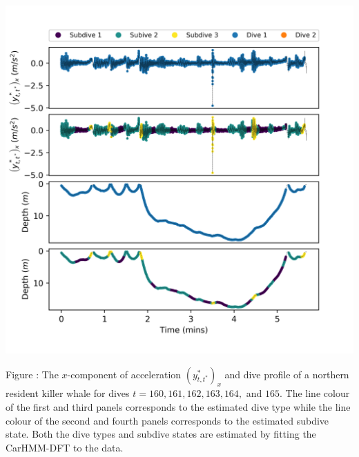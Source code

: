 \documentclass{article}
\begin{document}
        \begin{center}
        \includegraphics[width=6in]{../Plots/CarHMM_decoded_dives.png}
        \end{center}
        
        \noindent Figure : The $x$-component of acceleration $\left(y^*_{t,t^*}\right)_x$ and dive profile of a northern resident killer whale for dives $t = 160,161,162,163,164,$ and $165$. The line colour of the first and third panels corresponds to the estimated dive type while the line colour of the second and fourth panels corresponds to the estimated subdive state. Both the dive types and subdive states are estimated by fitting the CarHMM-DFT to the data.
        \addtocounter{fignum}{1}
        
\end{document}

